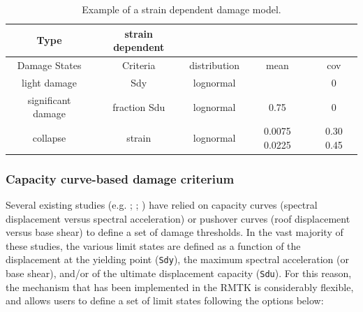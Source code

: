 \begin {table}[htb]
\caption{Example of a strain dependent damage model.} 
\label{table:strain_dmg} 
\begin{center}
  \begin{tabular}{ | c | c | c | c | c |}
  \hline
Type & strain dependent &  &  &  \\ \hline
Damage States & Criteria & distribution & mean & cov  \\ \hline
light damage & Sdy & lognormal &  & 0 \\ \hline
significant damage & fraction Sdu & lognormal & 0.75 & 0 \\ \hline
collapse & strain & lognormal & 0.0075 0.0225 & 0.30 0.45 \\ \hline
  \end{tabular}
\end{center}
\end{table}

\subsubsection{Capacity curve-based damage criterium}
\label{subsubsec:strain-dmg}
Several existing studies (e.g. \cite{Erberik2008}; \cite{SilvaEtAl2014c}; \cite{CasottoEtAl2005}) have relied on capacity curves (spectral displacement versus spectral acceleration) or pushover curves (roof displacement versus base shear) to define a set of damage thresholds. In the vast majority of these studies, the various limit states are defined as a function of the displacement at the yielding point (\verb=Sdy=), the maximum spectral acceleration (or base shear), and/or of the ultimate displacement capacity (\verb=Sdu=). For this reason, the mechanism that has been implemented in the RMTK is considerably flexible, and allows users to define a set of limit states following the options below:\\

